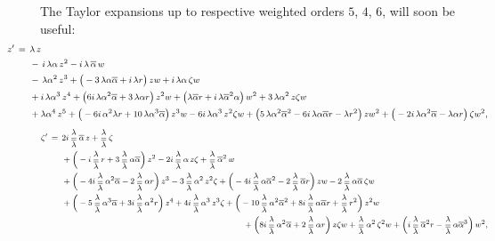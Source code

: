 \documentclass[12pt,twoside,leqno,openany]{amsart}
\begin{document}
The Taylor expansions up to respective weighted orders
$5$, $4$, $6$, will soon be useful:
\[
\!\!\!\!\!\!\!\!\!\!\!\!\!\!\!\!\!\!\!\!
\footnotesize
\aligned
z'
&
\,=\,
\lambda\,z
\\
&
\ \ \ \ \ 
-\,
i\,\lambda\alpha\,z^2
-
i\,\lambda\,\overline{\alpha}\,w
\\
&
\ \ \ \ \
-\,\lambda\alpha^2\,z^3
+
\big(-3\,\lambda\alpha\overline{\alpha}
+
i\,\lambda r\big)\,
zw
+
i\,\lambda\alpha\,\zeta w
\\
&
\ \ \ \ \
+
i\,\lambda\alpha^3\,z^4
+
\big(
6i\,\lambda\alpha^2\overline{\alpha}
+
3\,\lambda\alpha r
\big)\,z^2w
+
\big(
\lambda\overline{\alpha}r
+
i\,\lambda\overline{\alpha}^2\alpha
\big)\,
w^2
+
3\,\lambda\alpha^2\,z\zeta w
\\
&
\ \ \ \ \
+
\lambda\alpha^4\,z^5
+
\big(
-6i\,\alpha^2\lambda r
+
10\,\lambda\alpha^3\overline{\alpha}
\big)\,
z^3w
-
6i\,\lambda\alpha^3\,
z^2\zeta w
+
\big(
5\,\lambda\alpha^2\overline{\alpha}^2
-
6i\,\lambda\alpha\overline{\alpha}r
-
\lambda r^2
\big)\,
zw^2
+
\big(
-2i\,\lambda\alpha^2\overline{\alpha}
-
\lambda\alpha r
\big)\,
\zeta w^2,
\endaligned
\]
\[
\footnotesize
\aligned
\zeta'
&
\,=\,
2i\,
\frac{\lambda}{\overline{\lambda}}\,
\overline{\alpha}\,z
+
\frac{\lambda}{\overline{\lambda}}\,
\zeta
\\
&
\ \ \ \ \
+
\Big(
-i\,
\frac{\lambda}{\overline{\lambda}}\,
r
+
3\,
\frac{\lambda}{\overline{\lambda}}\,
\alpha\overline{\alpha}
\Big)\,
z^2
-
2i\,
\frac{\lambda}{\overline{\lambda}}\,
\alpha\,z\zeta
+
\frac{\lambda}{\overline{\lambda}}\,
\overline{\alpha}^2\,w
\\
&
\ \ \ \ \
+
\Big(
-4i\,
\frac{\lambda}{\overline{\lambda}}\,
\alpha^2\overline{\alpha}
-
2\,
\frac{\lambda}{\overline{\lambda}}\,
\alpha r
\Big)\,
z^3
-
3\,
\frac{\lambda}{\overline{\lambda}}\,
\alpha^2\,
z^2\zeta
+
\Big(
-4i\,
\frac{\lambda}{\overline{\lambda}}\,
\alpha\overline{\alpha}^2
-
2\,
\frac{\lambda}{\overline{\lambda}}\,
\overline{\alpha} r
\Big)\,
zw
-
2\,
\frac{\lambda}{\overline{\lambda}}\,
\alpha\overline{\alpha}\,
\zeta w
\\
&
\ \ \ \ \
+
\Big(
-5\,
\frac{\lambda}{\overline{\lambda}}\,
\alpha^3\overline{\alpha}
+
3i\,
\frac{\lambda}{\overline{\lambda}}\,
\alpha^2 r
\Big)\,
z^4
+
4i\,
\frac{\lambda}{\overline{\lambda}}\,
\alpha^3\,z^3\zeta
+
\Big(
-10\,
\frac{\lambda}{\overline{\lambda}}\,
\alpha^2\overline{\alpha}^2
+
8i\,
\frac{\lambda}{\overline{\lambda}}\,
\alpha\overline{\alpha}r
+
\frac{\lambda}{\overline{\lambda}}\,
r^2
\Big)\,
z^2w
\\
&
\ \ \ \ \ \ \ \ \ \ \ \ \ \ \ \ \ \ \ \ \ \ \ \ \ \ \ \ \ \ \ \ \ \ \ 
\ \ \ \ \ \ \ \ \ \ \ \ \ \ \ \ \ \ \ \ \ \ \ \ \ \ \ \ \ \ \ \ \ \ \ 
+
\Big(
8i\,
\frac{\lambda}{\overline{\lambda}}\,
\alpha^2\overline{\alpha}
+
2\,
\frac{\lambda}{\overline{\lambda}}\,
\alpha r
\Big)\,
z\zeta w
+
\frac{\lambda}{\overline{\lambda}}\,
\alpha^2\,\zeta^2w
+
\Big(
i\,
\frac{\lambda}{\overline{\lambda}}\,
\overline{\alpha}^2r
-
\frac{\lambda}{\overline{\lambda}}\,
\alpha\overline{\alpha}^3
\Big)\,
w^2,
\endaligned
\]
\end{document}
